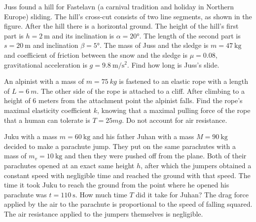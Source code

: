 \documentclass[11pt]{article}
\begin{document}
\probeng
\begin{figure}
	\vspace{-5pt}
\end{figure}
Juss found a hill for Fastelavn (a carnival tradition and holiday in Northern Europe) sliding. The hill’s cross-cut consists of two line segments, as shown in the figure. After the hill there is a horizontal ground. The height of the hill’s first part is \(h=\SI{2}{\meter}\) and its inclination is \(\alpha=\ang{20}\). The length of the second part is \(s=\SI{20}{\meter}\) and inclination \(\beta=\ang{5}\). The mass of Juss and the sledge is \(m=\SI{47}{\kilogram}\) and coefficient of friction between the snow and the sledge is \(\mu=\num{0.08}\), gravitational acceleration is \(g=\SI{9.8}{\meter\per\second\squared}\). Find how long is Juss’s slide.
\probend
\bigskip


\probeng
An alpinist with a mass of $m=\SI{75}{kg}$ is fastened to an elastic rope with a length of $L=\SI{6}{m}$. The other side of the rope is attached to a cliff. After climbing to a height of 6 meters from the attachment point the alpinist falls. Find the rope’s maximal elasticity coefficient $k$, knowing that a maximal pulling force of the rope that a human can tolerate is $T=25mg$. Do not account for air resistance.
\probend
\bigskip


\probeng
Juku with a mass $m=\SI{60}{\kg}$ and his father Juhan with a mass $M=\SI{90}{\kg}$ decided to make a parachute jump. They put on the same parachutes with a mass of $m_v=\SI{10}{\kg}$ and then they were pushed off from the plane. Both of their parachutes opened at an exact same height $h$, after which the jumpers obtained a constant speed with negligible time and reached the ground with that speed. The time it took Juku to reach the ground from the point where he opened his parachute was $t=\SI{110}{\s}$. How much time $T$ did it take for Juhan? The drag force applied by the air to the parachute is proportional to the speed of falling squared. The air resistance applied to the jumpers themselves is negligible.
\probend
\bigskip
\end{document}
